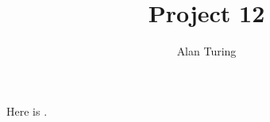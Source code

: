 \documentclass{article}
\title{Project 12}
\author{Alan Turing}
\begin{document}
\maketitle




Here is \extra{}.


\end{document}

